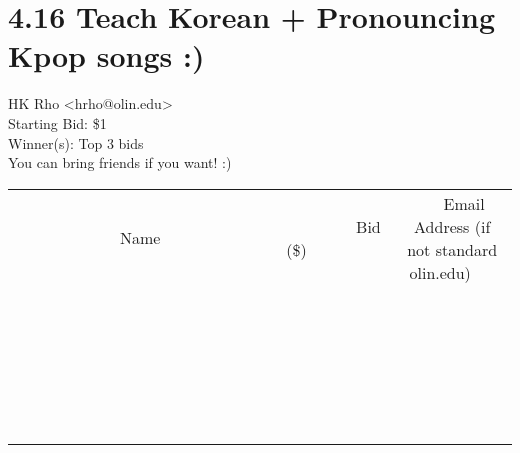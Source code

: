 \documentclass[11pt]{article}
\begin{document}
					\section*{4.16 Teach Korean + Pronouncing Kpop songs :)}
					HK Rho <hrho@olin.edu> \\
					Starting Bid: \$1 \\
					Winner(s): Top 3 bids \\
					You can bring friends if you want! :) \\
					[6ex]
					\begin{tabular}{c c c}
						~~~~~~~~~~~~~Name~~~~~~~~~~~~~ & ~~~~~~~~~Bid (\$)~~~~~~~~~ & ~~~Email Address (if not standard olin.edu)~~~ \\
				
 & & \\
\hline
 & & \\
\hline
 & & \\
\hline
 & & \\
\hline
 & & \\
\hline
 & & \\
\hline
 & & \\
\hline
 & & \\
\hline
 & & \\
\hline
 & & \\
\hline
 & & \\
\hline
 & & \\
\hline
 & & \\
\hline
 & & \\
\hline
 & & \\
\hline
 & & \\
\hline
 & & \\
\hline
 & & \\
\hline
 & & \\
\hline
 & & \\
\hline
 & & \\
\hline
 & & \\
\hline
 & & \\
\hline
 & & \\
\hline
 & & \\
\hline
 & & \\
\hline
					\end{tabular}
					\clearpage
				
\end{document}

